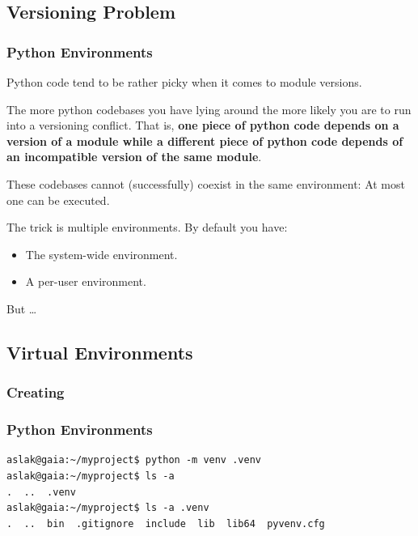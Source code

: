 {\subsection{Versioning Problem}
\begin{frame}[fragile]
  \frametitle{Python Environments }
  \vspace{1mm}
  Python code tend to be rather picky when it comes to module versions.
  
  \pause
  \vspace{5mm}
  The more python codebases you have lying around the more likely you are to run into a versioning conflict. That is, \textbf{one piece of python code depends on a version of a module while a different piece of python code depends of an incompatible version of the same module}.
  
  \vspace{5mm}
  These codebases cannot (successfully) coexist in the same environment: At most one can be executed.
  
  \pause
  \vspace{5mm}
  The trick is multiple environments. By default you have:
  \begin{itemize}
    \item The system-wide environment.
    \item A per-user environment.
  \end{itemize}
  
  \pause
  \vspace{3mm}
  But \ldots
\end{frame}

\subsection{Virtual Environments}
\subsubsection{Creating}
\begin{frame}[fragile]
  \frametitle{Python Environments  }
  \vspace{3mm}
  \begin{verbatim}
aslak@gaia:~/myproject$ python -m venv .venv
aslak@gaia:~/myproject$ ls -a
.  ..  .venv
aslak@gaia:~/myproject$ ls -a .venv
.  ..  bin  .gitignore  include  lib  lib64  pyvenv.cfg
  \end{verbatim}
\end{frame}

}
